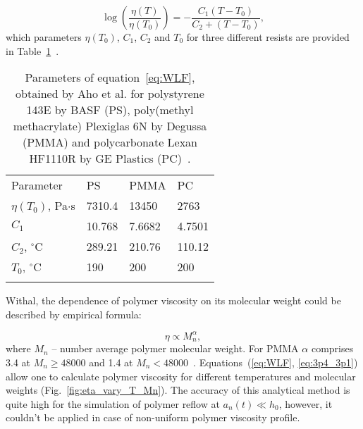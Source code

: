 \begin{equation} \label{eq:WLF}
	\log \left( \frac{\eta(T)}{\eta(T_0)} \right) = -\frac{C_1(T-T_0)}{C_2+(T-T_0)},
\end{equation}
which parameters $\eta(T_0)$, $C_1$, $C_2$ and $T_0$ for three different resists are provided in Table~\ref{table:WLF}~\cite{aho2008_measurement_WLF}.

\begin{table}[h]
	\centering
	\caption{Parameters of equation~\ref{eq:WLF}, obtained by Aho et al. for polystyrene 143E by BASF (PS), poly(methyl methacrylate) Plexiglas 6N by Degussa (PMMA) and polycarbonate Lexan HF1110R by GE Plastics (PC)~\cite{aho2008_measurement_WLF}.}
	\begin{tabular}{l l l l}
		\br
		Parameter \hspace{8.9em} & PS \hspace{5em} & PMMA \hspace{5em} & PC \\
		\mr
		$\eta(T_0)$, Pa$\cdot$s \hspace{8.9em} & 7310.4 \hspace{5em} & 13450 \hspace{5em} & 2763 \\
		$C_1$ \hspace{8.9em} & 10.768 \hspace{5em} & 7.6682 \hspace{5em} & 4.7501 \\
		$C_2$, $^\circ$C \hspace{8.9em} & 289.21 \hspace{5em} & 210.76 \hspace{5em} & 110.12 \\
		$T_0$, $^\circ$C \hspace{8.9em} & 190 \hspace{5em} & 200 \hspace{5em} & 200 \\
		\br
	\end{tabular}
	\label{table:WLF}
\end{table}

\noindent Withal, the dependence of polymer viscosity on its molecular weight could be described by empirical formula:

\begin{equation} \label{eq:3p4_3p1}
	\eta \propto M_n^\alpha,
\end{equation}
where $M_n$ -- number average polymer molecular weight. For PMMA $\alpha$ comprises 3.4 at $M_n \geq 48 000$ and 1.4 at $M_n < 48 000$~\cite{Leveder_2010, Bueche_3p4_1p4}. Equations~(\ref{eq:WLF}, \ref{eq:3p4_3p1}) allow one to calculate polymer viscosity for different temperatures and molecular weights (Fig.~\ref{fig:eta_vary_T_Mn}). The accuracy of this analytical method is quite high for the simulation of polymer reflow at $a_n(t) \ll h_0$, however, it couldn't be applied in case of non-uniform polymer viscosity profile.

